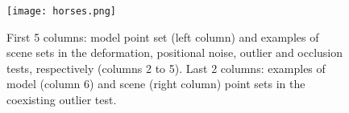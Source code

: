 \documentclass[11pt,bezier,]{article}
\begin{document}


\begin{figure}[t]
 \texttt{[image: horses.png]}


 
\caption{
First 5 columns:
model point set (left column) and 
examples of scene  sets in the deformation, positional noise,  outlier and  occlusion tests, respectively (columns 2 to 5).
Last 2 columns:
examples of model (column 6) and scene (right column) point sets in the coexisting outlier test.
\label{3D_test_exa}}
\end{figure}
\end{document}
